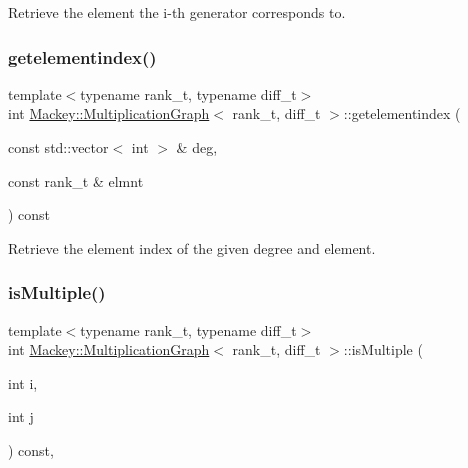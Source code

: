 Retrieve the element the i-\/th generator corresponds to. 

\mbox{\label{classMackey_1_1MultiplicationGraph_a2d76a0ac28dcead0d978ce6173b564f4}} 
\subsubsection{\texorpdfstring{getelementindex()}{getelementindex()}}
{\footnotesize\ttfamily template$<$typename rank\+\_\+t, typename diff\+\_\+t$>$ \\
int \hyperlink{classMackey_1_1MultiplicationGraph}{Mackey\+::\+Multiplication\+Graph}$<$ rank\+\_\+t, diff\+\_\+t $>$\+::getelementindex (\begin{DoxyParamCaption}\item[{const std\+::vector$<$ int $>$ \&}]{deg,  }\item[{const rank\+\_\+t \&}]{elmnt }\end{DoxyParamCaption}) const\hspace{0.3cm}{\ttfamily [inline]}}



Retrieve the element index of the given degree and element. 

\mbox{\label{classMackey_1_1MultiplicationGraph_a6ac7e92d6ceb6bc146f855898916449f}} 
\subsubsection{\texorpdfstring{is\+Multiple()}{isMultiple()}}
{\footnotesize\ttfamily template$<$typename rank\+\_\+t, typename diff\+\_\+t$>$ \\
int \hyperlink{classMackey_1_1MultiplicationGraph}{Mackey\+::\+Multiplication\+Graph}$<$ rank\+\_\+t, diff\+\_\+t $>$\+::is\+Multiple (\begin{DoxyParamCaption}\item[{int}]{i,  }\item[{int}]{j }\end{DoxyParamCaption}) const\hspace{0.3cm}{\ttfamily [inline]}, {\ttfamily [protected]}}



